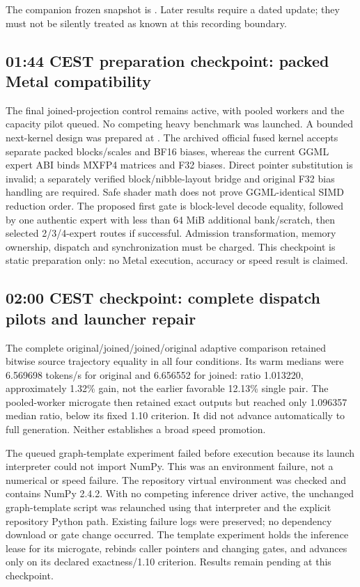 The companion frozen snapshot is
.
Later results require a dated update; they must not be silently treated as
known at this recording boundary.

\subsection{01:44 CEST preparation checkpoint: packed Metal compatibility}
The final joined-projection control remains active, with pooled workers and
the capacity pilot queued. No competing heavy benchmark was launched.
A bounded next-kernel design was prepared at
.
The archived official fused kernel accepts separate packed blocks/scales
and BF16 biases, whereas the current GGML expert ABI binds MXFP4 matrices
and F32 biases. Direct pointer substitution is invalid; a separately verified
block/nibble-layout bridge and original F32 bias handling are required.
Safe shader math does not prove GGML-identical SIMD reduction order.
The proposed first gate is block-level decode equality, followed by one
authentic expert with less than 64 MiB additional bank/scratch, then selected
2/3/4-expert routes if successful. Admission transformation, memory ownership,
dispatch and synchronization must be charged. This checkpoint is static
preparation only: no Metal execution, accuracy or speed result is claimed.

\subsection{02:00 CEST checkpoint: complete dispatch pilots and launcher repair}
The complete original/joined/joined/original adaptive comparison retained
bitwise source trajectory equality in all four conditions. Its warm medians
were 6.569698 tokens/s for original and 6.656552 for joined: ratio 1.013220,
approximately 1.32\% gain, not the earlier favorable 12.13\% single pair.
The pooled-worker microgate then retained exact outputs but reached only
1.096357 median ratio, below its fixed 1.10 criterion. It did not advance
automatically to full generation. Neither establishes a broad speed promotion.

The queued graph-template experiment failed before execution because its
launch interpreter could not import NumPy. This was an environment failure,
not a numerical or speed failure. The repository virtual environment was
checked and contains NumPy 2.4.2. With no competing inference driver active,
the unchanged graph-template script was relaunched using that interpreter
and the explicit repository Python path. Existing failure logs were preserved;
no dependency download or gate change occurred. The template experiment holds
the inference lease for its microgate, rebinds caller pointers and changing
gates, and advances only on its declared exactness/1.10 criterion. Results
remain pending at this checkpoint.

